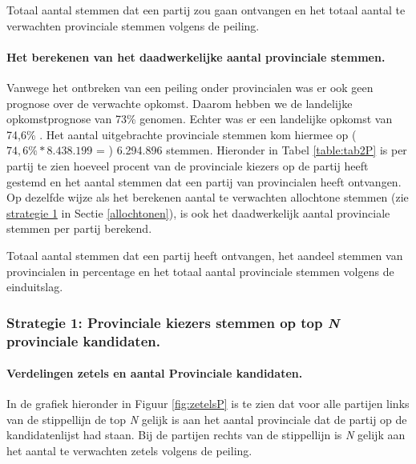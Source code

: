\begin{table}[h]
\centering
	\begin{footnotesize}
		
	\end{footnotesize}
			\caption{Totaal aantal stemmen dat een partij zou gaan ontvangen en het totaal aantal te verwachten provinciale stemmen volgens de peiling.}
\label{table:tab1P} 
\end{table}


\paragraph{Het berekenen van het daadwerkelijke aantal provinciale stemmen.}
Vanwege het ontbreken van een peiling onder provincialen was er ook geen prognose over de verwachte opkomst. Daarom hebben we de landelijke opkomstprognose van 73\% genomen. Echter was er een landelijke opkomst van 74,6\% \citep{Kiesraad_uitslag}. Het aantal uitgebrachte provinciale stemmen kom hiermee op ($74,6\%*8.438.199$ = ) 6.294.896 stemmen. Hieronder in Tabel \ref{table:tab2P} is per partij te zien hoeveel procent van de provinciale kiezers op de partij heeft gestemd en het aantal stemmen dat een partij van provincialen heeft ontvangen. Op dezelfde wijze als het berekenen aantal te verwachten allochtone stemmen (zie \hyperref[S1A]{strategie 1} in Sectie \ref{allochtonen}), is ook het daadwerkelijk aantal provinciale stemmen per partij berekend. 
   
\begin{table}[h]
\centering
	\begin{footnotesize}
		
	\end{footnotesize}
			\caption{Totaal aantal stemmen dat een partij heeft ontvangen, het aandeel stemmen van provincialen in percentage en het totaal aantal provinciale stemmen volgens de einduitslag.}
\label{table:tab2P} 
\end{table}

\subsubsection{Strategie 1: Provinciale kiezers stemmen op top \textit{N} provinciale kandidaten.}
\label{sssec:S1P}


 
\paragraph{Verdelingen zetels en aantal Provinciale kandidaten.}
In de grafiek hieronder in Figuur \ref{fig:zetelsP} is te zien dat voor alle partijen links van de stippellijn de top \textit{N} gelijk is aan het aantal provinciale dat de partij op de kandidatenlijst had staan. Bij de partijen rechts van de stippellijn is \textit{N} gelijk aan het aantal te verwachten zetels volgens de peiling. 


